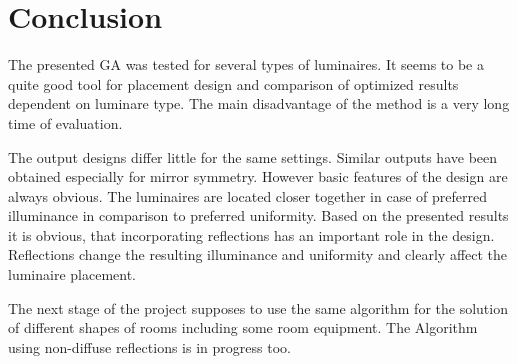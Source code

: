 \section{Conclusion}

The presented GA was tested for several types of luminaires. It seems to be a quite good tool for placement design and comparison of optimized results dependent on luminare type. The main disadvantage of the method is a very long time of evaluation.

The output designs differ little for the same settings. Similar outputs have been obtained especially for mirror symmetry. However basic features of the design are always obvious. The luminaires are located closer together in case of preferred illuminance in comparison to preferred uniformity.
\newpage
Based on the presented results it is obvious, that incorporating reflections has an important role in the design. Reflections change the resulting illuminance and uniformity and clearly affect the luminaire placement.

The next stage of the project supposes to use the same algorithm for the solution of different shapes of rooms including some room equipment. The Algorithm using non-diffuse reflections is in progress too.